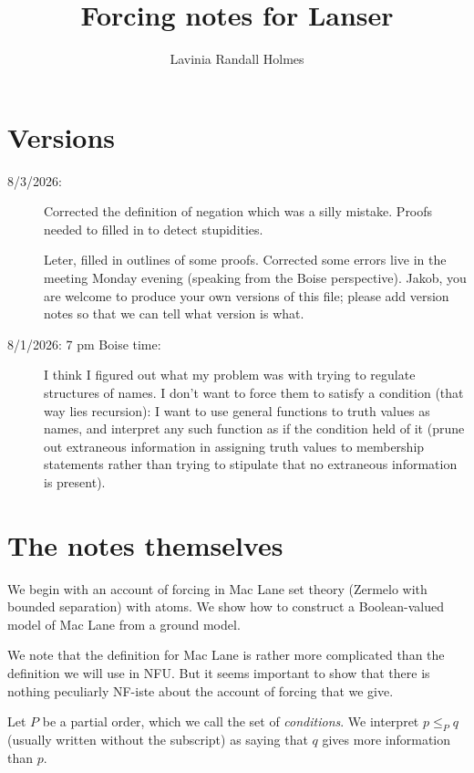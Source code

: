 \documentclass[12pt]{article}
\title{Forcing notes for Lanser}
\author{Lavinia Randall Holmes}
\begin{document}
\maketitle

\section{Versions}

\begin{description}

\item[8/3/2026:]  Corrected the definition of negation which was a silly mistake.  Proofs needed to filled in to detect stupidities.

Leter, filled in outlines of some proofs.   Corrected some errors live in the meeting Monday evening (speaking from the Boise perspective).  Jakob, you are welcome to produce your own versions of this file;  please add version notes so that we can tell what version is what.

\item[8/1/2026:  7 pm Boise time:]  I think I figured out what my problem was with trying to regulate structures of names.  I don't want to force them to satisfy a condition (that way lies recursion):  I want to use general functions to truth values as names, and interpret any such function as if the condition held of it (prune out extraneous information in assigning truth values to membership statements rather than trying to stipulate that no extraneous information is present).

\end{description}

\section{The notes themselves}

We begin with an account of forcing in Mac Lane set theory (Zermelo with bounded separation) with atoms.  We show how to construct a Boolean-valued model of Mac Lane from a ground model.

We note that the definition for Mac Lane is rather more complicated than the definition we will use in NFU.  But it seems important to show that there is nothing peculiarly NF-iste about the account of forcing that we give.

Let $P$ be a partial order, which we call the set of {\em conditions\/}.   We interpret $p \leq_P q$ (usually written without the subscript) as saying that $q$ gives
more information than $p$.
\end{document}
